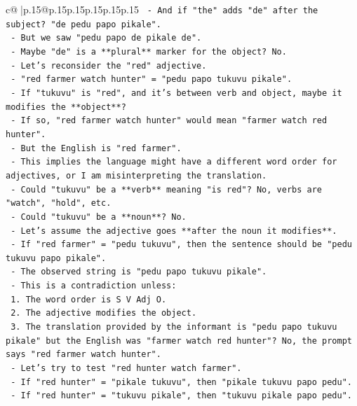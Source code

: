 \documentclass{article}
\begin{document}
{\begin{supertabular}{c@{$\;$}|p{.15\linewidth}@{}p{.15\linewidth}p{.15\linewidth}p{.15\linewidth}p{.15\linewidth}p{.15\linewidth}}
{{{\texttt{           {-} And if "the" adds "de" after the subject? "de pedu papo pikale".} \\
\texttt{           {-} But we saw "pedu papo de pikale de".} \\
\texttt{           {-} Maybe "de" is a **plural** marker for the object? No.} \\
\texttt{           {-} Let's reconsider the "red" adjective.} \\
\texttt{           {-} "red farmer watch hunter" = "pedu papo tukuvu pikale".} \\
\texttt{           {-} If "tukuvu" is "red", and it's between verb and object, maybe it modifies the **object**?} \\
\texttt{           {-} If so, "red farmer watch hunter" would mean "farmer watch red hunter".} \\
\texttt{           {-} But the English is "red farmer".} \\
\texttt{           {-} This implies the language might have a different word order for adjectives, or I am misinterpreting the translation.} \\
\texttt{           {-} Could "tukuvu" be a **verb** meaning "is red"? No, verbs are "watch", "hold", etc.} \\
\texttt{           {-} Could "tukuvu" be a **noun**? No.} \\
\texttt{           {-} Let's assume the adjective goes **after the noun it modifies**.} \\
\texttt{           {-} If "red farmer" = "pedu tukuvu", then the sentence should be "pedu tukuvu papo pikale".} \\
\texttt{           {-} The observed string is "pedu papo tukuvu pikale".} \\
\texttt{           {-} This is a contradiction unless:} \\
\texttt{             1. The word order is S V Adj O.} \\
\texttt{             2. The adjective modifies the object.} \\
\texttt{             3. The translation provided by the informant is "pedu papo tukuvu pikale" but the English was "farmer watch red hunter"? No, the prompt says "red farmer watch hunter".} \\
\texttt{           {-} Let's try to test "red hunter watch farmer".} \\
\texttt{             {-} If "red hunter" = "pikale tukuvu", then "pikale tukuvu papo pedu".} \\
\texttt{             {-} If "red hunter" = "tukuvu pikale", then "tukuvu pikale papo pedu".} \\
}}}
\end{supertabular}}
\end{document}
